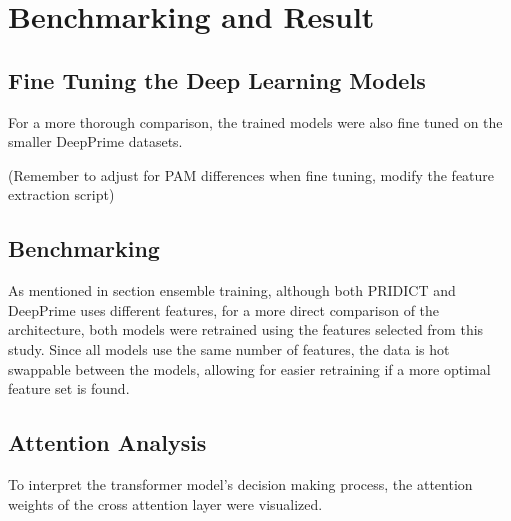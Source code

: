 \chapter{Benchmarking and Result}

\section{Fine Tuning the Deep Learning Models}

For a more thorough comparison, the trained models were also fine tuned on the smaller DeepPrime datasets.

(Remember to adjust for PAM differences when fine tuning, modify the feature extraction script)

\section{Benchmarking}

As mentioned in section {ensemble training}, although both PRIDICT and DeepPrime uses different features, for a more direct comparison of the architecture, both models were retrained using the features selected from this study. Since all models use the same number of features, the data is hot swappable between the models, allowing for easier retraining if a more optimal feature set is found.

\section{Attention Analysis}
\label{sec:attention_analysis}

To interpret the transformer model's decision making process, the attention weights of the cross attention layer were visualized. 